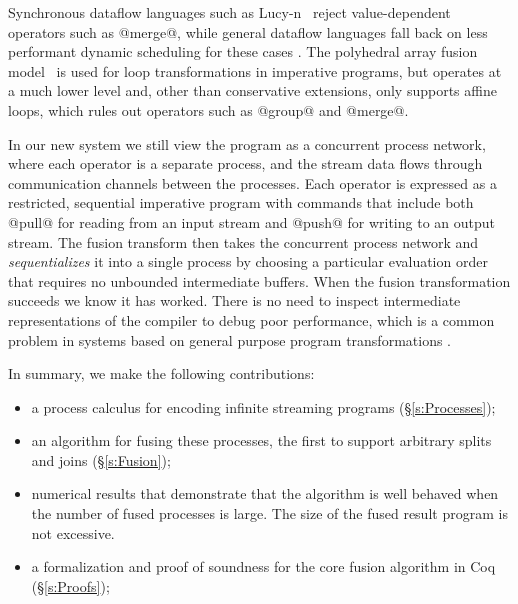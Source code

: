 
Synchronous dataflow languages such as Lucy-n~\cite{mandel2010lucy} reject value-dependent operators such as @merge@, while general dataflow languages fall back on less performant dynamic scheduling for these cases \cite{bouakaz2013real}. The polyhedral array fusion model~\cite{feautrier2011polyhedron} is used for loop transformations in imperative programs, but operates at a much lower level and, other than conservative extensions, only supports affine loops, which rules out operators such as @group@ and @merge@.

In our new system we still view the program as a concurrent process network, where each operator is a separate process, and the stream data flows through communication channels between the processes. Each operator is expressed as a restricted, sequential imperative program with commands that include both @pull@ for reading from an input stream and @push@ for writing to an output stream. The fusion transform then takes the concurrent process network and \emph{sequentializes} it into a single process by choosing a particular evaluation order that requires no unbounded intermediate buffers. When the fusion transformation succeeds we know it has worked. There is no need to inspect intermediate representations of the compiler to debug poor performance, which is a common problem in systems based on general purpose program transformations \cite{lippmeier2012:guiding}.

In summary, we make the following contributions:
\begin{itemize}
\item a process calculus for encoding infinite streaming programs (\S\ref{s:Processes});
\item an algorithm for fusing these processes, the first to support arbitrary splits and joins (\S\ref{s:Fusion});
\item numerical results that demonstrate that the algorithm is well behaved when the number of fused processes is large. The size of the fused result program is not excessive. 
\item a formalization and proof of soundness for the core fusion algorithm in Coq (\S\ref{s:Proofs});
\end{itemize}

